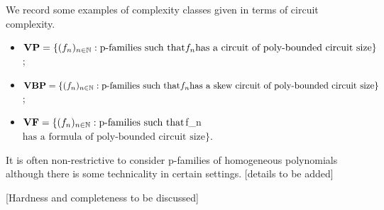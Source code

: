 We record some examples of complexity classes given in terms of circuit complexity.
\begin{itemize}
 \item $\mathbf{VP} = \{ (f_n) _{n \in \mathbb{N}} : \text{p-families such that} f_n \text{has a circuit of poly-bounded circuit size}\}$;
 \item $\mathbf{VBP} = \{ (f_n) _{n \in \mathbb{N}} : \text{p-families such that} f_n \text{has a skew circuit of poly-bounded circuit size}\}$;
 \item $\mathbf{VF} = \{ (f_n) _{n \in \mathbb{N}} : \text{p-families such that} $f_n$ \text{has a formula of poly-bounded circuit size}\}$.
\end{itemize}
It is often non-restrictive to consider p-families of homogeneous polynomials although there is some technicality in certain settings. [details to be added]

[Hardness and completeness to be discussed]

